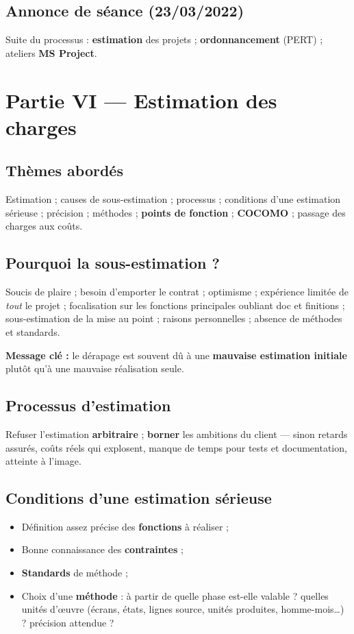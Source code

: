 \documentclass[11pt,a4paper]{article}
\begin{document}
\subsection{Annonce de séance (23/03/2022)}
Suite du processus : \textbf{estimation} des projets ; \textbf{ordonnancement} (PERT) ; ateliers \textbf{MS Project}.

\section{Partie VI — Estimation des charges}

\subsection{Thèmes abordés}
Estimation ; causes de sous-estimation ; processus ; conditions d'une estimation sérieuse ; précision ; méthodes ; \textbf{points de fonction} ; \textbf{COCOMO} ; passage des charges aux coûts.

\subsection{Pourquoi la sous-estimation ?}
Soucis de plaire ; besoin d'emporter le contrat ; optimisme ; expérience limitée de \emph{tout} le projet ; focalisation sur les fonctions principales oubliant doc et finitions ; sous-estimation de la mise au point ; raisons personnelles ; absence de méthodes et standards.

\textbf{Message clé :} le dérapage est souvent dû à une \textbf{mauvaise estimation initiale} plutôt qu'à une mauvaise réalisation seule.

\subsection{Processus d'estimation}
Refuser l'estimation \textbf{arbitraire} ; \textbf{borner} les ambitions du client — sinon retards assurés, coûts réels qui explosent, manque de temps pour tests et documentation, atteinte à l'image.

\subsection{Conditions d'une estimation sérieuse}
\begin{itemize}[nosep]
  \item Définition assez précise des \textbf{fonctions} à réaliser ;
  \item Bonne connaissance des \textbf{contraintes} ;
  \item \textbf{Standards} de méthode ;
  \item Choix d'une \textbf{méthode} : à partir de quelle phase est-elle valable ? quelles unités d'\oe uvre (écrans, états, lignes source, unités produites, homme-mois\ldots) ? précision attendue ?
\end{itemize}
\end{document}

